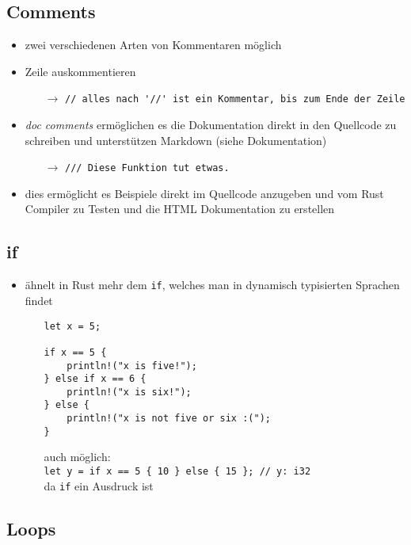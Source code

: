 \documentclass[a4paper,12pt]{article}
\begin{document}
\subsection{Comments}	
\begin{itemize}
  \item zwei verschiedenen Arten von Kommentaren möglich
  \item Zeile auskommentieren
  \begin{itemize}
      \item[$\rightarrow$] \verb|// alles nach '//' ist ein Kommentar, bis zum Ende der Zeile| 
  \end{itemize}
  \item \textit{doc comments} ermöglichen es die Dokumentation direkt in den Quellcode zu schreiben und unterstützen Markdown (siehe Dokumentation)
  \begin{itemize}
      \item[$\rightarrow$] \verb|/// Diese Funktion tut etwas.| 
  \end{itemize}
  \item dies ermöglicht es Beispiele direkt im Quellcode anzugeben und vom Rust Compiler zu Testen und die HTML Dokumentation zu erstellen
\end{itemize}

\subsection{if}
\begin{itemize}
  \item ähnelt in Rust mehr dem \verb|if|, welches man in dynamisch typisierten Sprachen findet
  \begin{itemize}
      \item[]
\begin{verbatim}
let x = 5;

if x == 5 {
    println!("x is five!");
} else if x == 6 {
    println!("x is six!");
} else {
    println!("x is not five or six :(");
}
\end{verbatim}
	\item[] auch möglich:\\\verb|let y = if x == 5 { 10 } else { 15 }; // y: i32|\\ da \verb|if| ein Ausdruck ist	
  \end{itemize}
\end{itemize}

\subsection{Loops}
\end{document}
